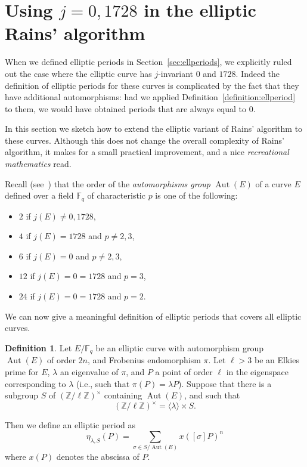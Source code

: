 \documentclass[12pt]{article}
\theoremstyle{plain}
\theoremstyle{definition}
\newtheorem{definition}[theorem]{Definition}
\DeclareMathOperator{\Aut}{Aut}
\def\Z{\ensuremath{\mathbb{Z}}}
\def\F{\ensuremath{\mathbb{F}}}
\newcounter{algorithm}
\begin{document}

\section{Using $j=0,1728$ in the elliptic Rains' algorithm}
\label{app:elliptic-curves}

When we defined elliptic periods in Section~\ref{sec:ellperiods}, we
explicitly ruled out the case where the elliptic curve has
$j$-invariant $0$ and $1728$. %
Indeed the definition of elliptic periods for these curves is
complicated by the fact that they have additional automorphisms: had
we applied Definition~\ref{definition:ellperiod} to them, we would
have obtained periods that are always equal to $0$.

In this section we sketch how to extend the elliptic variant of Rains'
algorithm to these curves. %
Although this does not change the overall complexity of Rains'
algorithm, it makes for a small practical improvement, and a nice
\emph{recreational mathematics} read.

Recall (see~\cite[III.10]{Sil}) that the order of the
\emph{automorphisms group} $\Aut(E)$ of a curve $E$ defined over a
field $\F_q$ of characteristic $p$ is one of the following:
\begin{itemize}
\item $2$ if $j(E)\ne0,1728$,
\item $4$ if $j(E) = 1728$ and $p\ne2,3$,
\item $6$ if $j(E) = 0$ and $p\ne2,3$,
\item $12$ if $j(E) = 0 = 1728$ and $p=3$,
\item $24$ if $j(E) = 0 = 1728$ and $p=2$.
\end{itemize}
We can now give a meaningful definition of elliptic periods that
covers all elliptic curves.

\begin{definition}
  \label{definition:ellperiod-general}
  Let $E/\F_q$ be an elliptic curve with automorphism group $\Aut(E)$
  of order $2n$, and Frobenius endomorphism $\pi$. %
  Let $\ell > 3$ be an Elkies prime for $E$, $\lambda$ an eigenvalue
  of $\pi$, and $P$ a point of order $\ell$ in the eigenspace
  corresponding to $\lambda$ (i.e., such that $\pi(P)=\lambda P$). %
  Suppose that there is a subgroup $S$ of $(\Z/\ell\Z)^{\times}$
  containing $\Aut(E)$, and such that
  \begin{equation*}
    (\Z/\ell\Z)^{\times} = \langle{\lambda}\rangle \times S.
  \end{equation*}
  
  Then we define an elliptic period as
  \begin{equation*}
    \eta_{\lambda,S}(P) =
    \sum_{\sigma\in S/\Aut(E)} {x\left([\sigma] P \right)^n} 
  \end{equation*}
  where $x(P)$ denotes the abscissa of $P$.
\end{definition}
\end{document}
